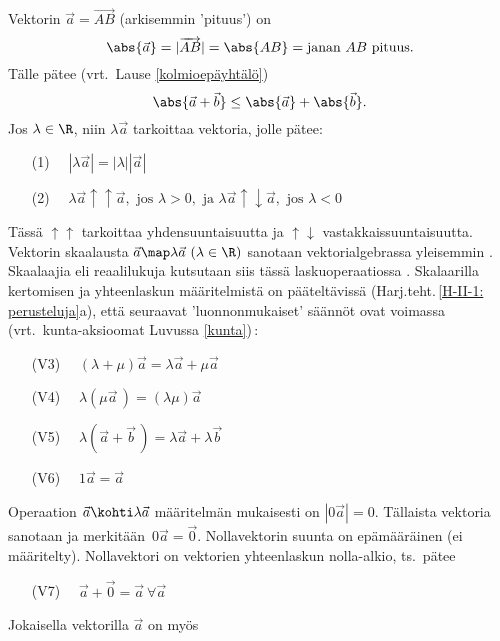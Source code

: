 Vektorin $\vec a = \overrightarrow{AB}$
%
 (arkisemmin 'pituus') on
\[
\abs{\vec a}=|\overrightarrow{AB}|=\abs{AB}=\text{janan }AB\text{ pituus}.
\]
Tälle pätee  (vrt.\ Lause \ref{kolmioepäyhtälö})
%
\[
\abs{\vec a+\vec b} \le \abs{\vec a}+\abs{\vec b}.
\]
Jos $\lambda \in \R$, niin $\lambda \vec a$ tarkoittaa
%
 vektoria, jolle pätee:
\begin{itemize}
\item[(1)] $\quad |\lambda \vec a|=|\lambda||\vec a|$
\item[(2)] $\quad \lambda \vec a \uparrow\uparrow \vec a,
                                 \text{ jos } \lambda > 0, \text{ ja }
                  \lambda \vec a \uparrow\downarrow \vec a, \text{ jos } \lambda<0$
\end{itemize}
Tässä $\uparrow\uparrow$ tarkoittaa yhdensuuntaisuutta ja $\uparrow\downarrow$ 
vastakkaissuuntaisuutta. Vektorin skaalausta $\vec a \map \lambda \vec a \ (\lambda \in \R)$
sanotaan vektorialgebrassa yleisemmin . Skaalaajia eli
reaalilukuja kutsutaan siis tässä laskuoperaatiossa
%
. Skalaarilla kertomisen ja yhteenlaskun
määritelmistä on pääteltävissä (Harj.teht.\,\ref{H-II-1: perusteluja}a), että seuraavat
'luonnonmukaiset' säännöt ovat voimassa (vrt.\ kunta-aksioomat Luvussa \ref{kunta})\,:
\begin{itemize}
\item[(V3)] $\quad (\lambda + \mu)\vec a = \lambda \vec a + \mu \vec a$
\item[(V4)] $\quad \lambda(\mu \vec a\,) = (\lambda \mu)\vec a$
\item[(V5)] $\quad \lambda(\vec a + \vec b\,)= \lambda \vec a + \lambda \vec b$
\item[(V6)] $\quad 1 \vec a =  \vec a$
\end{itemize}
Operaation $\vec a \kohti \lambda \vec a$ määritelmän mukaisesti on $|0 \vec a|=0$.
Tällaista vektoria sanotaan
%
 ja merkitään $\,0 \vec a = \vec 0$.
Nollavektorin suunta on epämääräinen  (ei määritelty). Nollavektori on vektorien
yhteenlaskun nolla-alkio, ts.\ pätee
\begin{itemize}
\item[(V7)] $\quad \vec a + \vec 0 = \vec a\ \forall \vec a$ 
\end{itemize}
Jokaisella vektorilla $\vec a$ on myös
%
